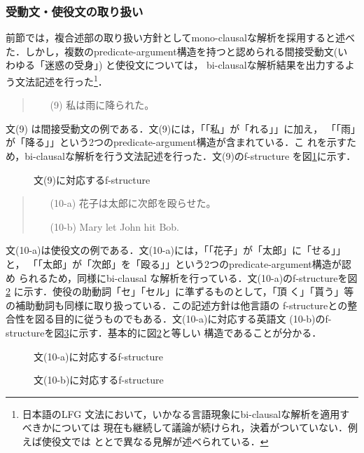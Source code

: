 \subsubsection{受動文・使役文の取り扱い}
前節では，複合述部の取り扱い方針としてmono-clausalな解析を採用すると述べ
た．しかし，複数のpredicate-argument構造を持つと認められる間接受動文(い
わゆる「迷惑の受身」) \cite{masuoka1997}と使役文については，
bi-clausalな解析結果を出力するよう文法記述を行った\footnote{日本語のLFG 
文法において，いかなる言語現象にbi-clausalな解析を適用すべきかについては
現在も継続して議論が続けられ，決着がついていない．例えば使役文では
\cite{matsumoto1996}と\cite{Yokota2001}とで異なる見解が述べられている．}．
\begin{quote}
\begin{itemize}
\item[(9)] 私は雨に降られた。
\end{itemize}
\end{quote}
文(9) は間接受動文の例である．文(9)には，「「私」が「れる」」に加え，
「「雨」が「降る」」という2つのpredicate-argument構造が含まれている．こ
れを示すため，bi-clausalな解析を行う文法記述を行った．文(9)のf-structure
を図\ref{fig4-3}に示す．
\begin{figure}[htb]
\center
\epsfxsize=122.1mm
\caption{文(9)に対応するf-structure}
\label{fig4-3}
\end{figure}
\begin{quote}
\begin{itemize}
\item[(10-a)]花子は太郎に次郎を殴らせた。
\item[(10-b)]Mary let John hit Bob. 
\end{itemize}
\end{quote}
文(10-a)は使役文の例である．文(10-a)には，「「花子」が「太郎」に「せる」」と，
「「太郎」が「次郎」を「殴る」」という2つのpredicate-argument構造が認め
られるため，同様にbi-clausal な解析を行っている．文(10-a)のf-structureを図
\ref{fig4-4} に示す．使役の助動詞「セ」「セル」に準ずるものとして，「頂
く」「貰う」等の補助動詞も同様に取り扱っている．この記述方針は他言語の
f-structureとの整合性を図る目的に従うものでもある．文(10-a)に対応する英語文
(10-b)のf-structureを図\ref{fig4-x}に示す．基本的に図\ref{fig4-4}と等しい
構造であることが分かる．
\begin{figure}[htbp]
\center
\epsfxsize=86.36mm
\caption{文(10-a)に対応するf-structure}
\label{fig4-4}
\end{figure}
\begin{figure}[htbp]
\center
\epsfxsize=95.03mm
\caption{文(10-b)に対応するf-structure}
\label{fig4-x}
\end{figure}
